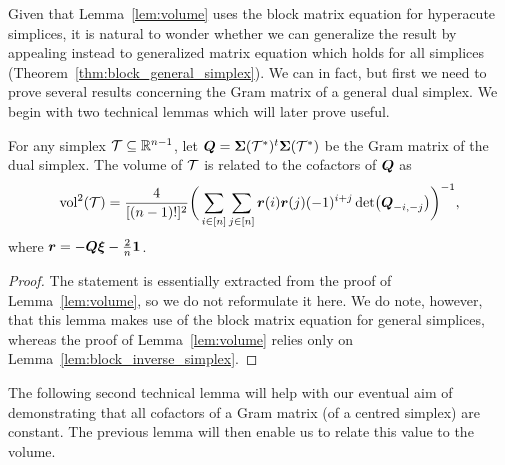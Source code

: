 Given that Lemma~\ref{lem:volume} uses the block matrix equation  for hyperacute simplices, it  is natural  to wonder whether we  can generalize the result by appealing instead to generalized matrix equation which holds for all simplices  (Theorem~\ref{thm:block_general_simplex}). We can in fact, but first  we need to prove several results concerning the Gram matrix of a  general  dual  simplex.  We begin  with two  technical lemmas which  will later prove useful. 

\begin{lemma}
	\label{lem:volume_cofactors}
	For any simplex $\mathcal{T}\subseteq\mathbb{R}^{n-1}$, let $\vb*{Q}=\boldsymbol{\Sigma}(\mathcal{T}^*)^t\boldsymbol{\Sigma}(\mathcal{T}^*)$ be the Gram matrix of the dual simplex. The volume of $\mathcal{T}$ is related  to  the cofactors of $\vb*{Q}$ as 
	\begin{equation*}
	\textnormal{vol}^2(\mathcal{T}) = \frac{4}{[(n-1)!]^2} \bigg(\sum_{i\in[n]}\sum_{j\in[n]} \vb*{r}(i)\vb*{r}(j)(-1)^{i+j}\det(\vb*{Q}_{-i,-j})\bigg)^{-1},
	\end{equation*}
	where $\vb*{r}=-\vb*{Q}\vb*{\xi}-\frac{2}{n}\vb{1}$. 
\end{lemma}
\begin{proof}
	The statement  is essentially  extracted from the proof of Lemma~\ref{lem:volume}, so we do not reformulate it here. We do  note, however, that this lemma makes use of the block matrix equation for general simplices, whereas the proof of Lemma~\ref{lem:volume}  relies  only on Lemma~\ref{lem:block_inverse_simplex}. 
\end{proof}

The following second technical lemma will help with our eventual aim of demonstrating  that all cofactors of a Gram matrix (of a centred simplex) are constant. The  previous lemma will then  enable us  to relate this value to the volume. 

